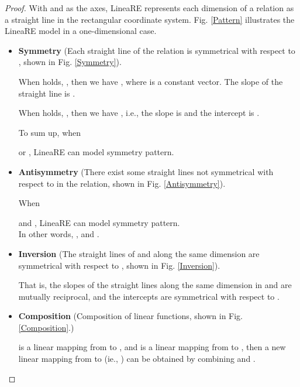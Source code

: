 \documentclass[conference]{IEEEtran}
\begin{document}
\begin{proof}
	With  and  as the axes, LineaRE represents each dimension of a relation as a straight line in the rectangular coordinate system. Fig. \ref{Pattern} illustrates the LineaRE model in a one-dimensional case.
	\begin{itemize}
		\item \textbf{Symmetry} (Each straight line of the relation is symmetrical with respect to , shown in Fig. \ref{Symmetry}).
		\begin{flushleft}
			
		\end{flushleft}
		 When
		 holds, , then we have , where  is a constant vector. The slope of the straight line is .
		
		 When
		 holds, , then we have
		, i.e., the slope is  and the intercept is .
		
		To sum up, when
		
		or
		,
		LineaRE can model symmetry pattern. \\
		
		\item \textbf{Antisymmetry} (There exist some straight lines not symmetrical with respect to  in the relation, shown in Fig. \ref{Antisymmetry}).
		
		When
		
		and
		,
		LineaRE can model symmetry pattern. \\
		In other words, , 
		and
		.
		
		\item \textbf{Inversion} (The straight lines of  and  along the same dimension are symmetrical with respect to , shown in Fig. \ref{Inversion}).
\begin{flushleft}
			
		\end{flushleft}
That is, the slopes of the straight lines along the same dimension in  and  are mutually reciprocal, and the intercepts are symmetrical with respect to .
		
		\item \textbf{Composition} (Composition of linear functions, shown in Fig. \ref{Composition}.)
		\begin{flushleft}
			
		\end{flushleft}
		 is a linear mapping from  to , and  is a linear mapping from  to , then a new linear mapping from  to  (ie., ) can be obtained by combining  and .
	\end{itemize}
\end{proof}
\end{document}
